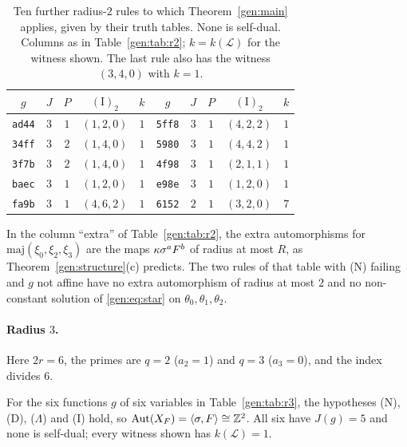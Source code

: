 \begin{table}[ht]
\caption{Ten further radius-$2$ rules to which Theorem~\ref{gen:main} applies, given by their truth tables. None is self-dual. Columns as in Table~\ref{gen:tab:r2}; $k=k(\mathcal L)$ for the witness shown. The last rule also has the witness $(3,4,0)$ with $k=1$.}
\label{gen:tab:r2ten}
\centering
\small
\begin{tabular}{ccccc@{\qquad\qquad}ccccc}
\toprule
$g$ & $J$ & $P$ & $(\mathrm I)_2$ & $k$ & $g$ & $J$ & $P$ & $(\mathrm I)_2$ & $k$\\
\midrule
\texttt{ad44} & $3$ & $1$ & $(1,2,0)$ & $1$ & \texttt{5ff8} & $3$ & $1$ & $(4,2,2)$ & $1$\\
\texttt{34ff} & $3$ & $2$ & $(1,4,0)$ & $1$ & \texttt{5980} & $3$ & $1$ & $(4,4,2)$ & $1$\\
\texttt{3f7b} & $3$ & $2$ & $(1,4,0)$ & $1$ & \texttt{4f98} & $3$ & $1$ & $(2,1,1)$ & $1$\\
\texttt{baec} & $3$ & $1$ & $(1,2,0)$ & $1$ & \texttt{e98e} & $3$ & $1$ & $(1,2,0)$ & $1$\\
\texttt{fa9b} & $3$ & $1$ & $(4,6,2)$ & $1$ & \texttt{6152} & $2$ & $1$ & $(3,2,0)$ & $7$\\
\bottomrule
\end{tabular}
\end{table}

In the column ``extra'' of Table~\ref{gen:tab:r2}, the extra automorphisms for $\mathrm{maj}(\xi_0,\xi_2,\xi_3)$ are the maps $\kappa\sigma^aF^b$ of radius at most $R$, as Theorem~\ref{gen:structure}(c) predicts. The two rules of that table with \textup{(N)} failing and $g$ not affine have no extra automorphism of radius at most $2$ and no non-constant solution of \eqref{gen:eq:star} on $\theta_0,\theta_1,\theta_2$.

\paragraph{Radius $3$.} Here $2r=6$, the primes are $q=2$ ($a_2=1$) and $q=3$ ($a_3=0$), and the index divides $6$.

\begin{proposition}\label{gen:prop:r3}
For the six functions $g$ of six variables in Table~\ref{gen:tab:r3}, the hypotheses \textup{(N)}, \textup{(D)}, \textup{($\Lambda$)} and \textup{(I)} hold, so $\operatorname{Aut}(X_F)=\langle\sigma,F\rangle\cong\mathbb{Z}^2$. All six have $J(g)=5$ and none is self-dual; every witness shown has $k(\mathcal L)=1$.
\end{proposition}

